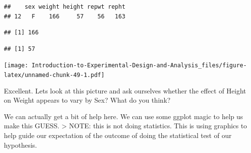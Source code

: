 \documentclass[
]{book}
\newenvironment{Shaded}{\begin{snugshade}}{\end{snugshade}}
\newcommand{\AttributeTok}[1]{\textcolor[rgb]{0.77,0.63,0.00}{#1}}
\newcommand{\CommentTok}[1]{\textcolor[rgb]{0.56,0.35,0.01}{\textit{#1}}}
\newcommand{\DecValTok}[1]{\textcolor[rgb]{0.00,0.00,0.81}{#1}}
\newcommand{\FunctionTok}[1]{\textcolor[rgb]{0.00,0.00,0.00}{#1}}
\newcommand{\NormalTok}[1]{#1}
\newcommand{\OtherTok}[1]{\textcolor[rgb]{0.56,0.35,0.01}{#1}}
\newcommand{\SpecialCharTok}[1]{\textcolor[rgb]{0.00,0.00,0.00}{#1}}
\begin{document}
\begin{verbatim}
##    sex weight height repwt repht
## 12   F    166     57    56   163
\end{verbatim}

\begin{Shaded}
\end{Shaded}

\begin{verbatim}
## [1] 166
\end{verbatim}

\begin{Shaded}
\end{Shaded}

\begin{verbatim}
## [1] 57
\end{verbatim}

\begin{Shaded}
\end{Shaded}

\texttt{[image: Introduction-to-Experimental-Design-and-Analysis\_files/figure-latex/unnamed-chunk-49-1.pdf]}

Excellent. Lets look at this picture and ask ourselves whether the effect of Height on Weight appears to vary by Sex? What do you think?

We can actually get a bit of help here. We can use some ggplot magic to help us make this GUESS.
\textgreater{} NOTE: this is not doing statistics. This is using graphics to help guide our expectation of the outcome of doing the statistical test of our hypothesis.
\end{document}
